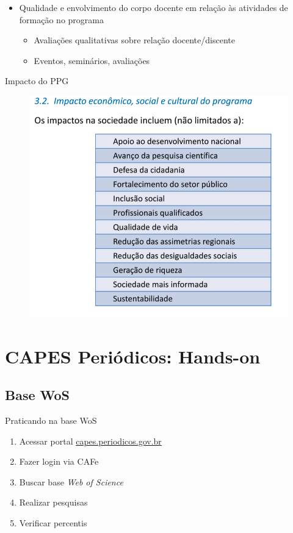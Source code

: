 \begin{frame}
\begin{itemize}
\item Qualidade e envolvimento do corpo docente em relação às atividades
de formação no programa
\begin{itemize}
\item Avaliações qualitativas sobre relação docente/discente
\item Eventos, seminários, avaliações
\end{itemize}
\end{itemize}
\end{frame}

\begin{frame}{Impacto do PPG}
\begin{figure}
\centering
\includegraphics[scale=0.35]{figs/03/impactos}
\end{figure}
\end{frame}


\section{CAPES Periódicos: Hands-on}

\subsection{Base WoS}

\begin{frame}{Praticando na base WoS}
\begin{enumerate}
\item Acessar portal \url{capes.periodicos.gov.br}
\item Fazer login via CAFe
\item Buscar base \textit{Web of Science}
\item Realizar pesquisas
\item Verificar percentis
\end{enumerate}
\end{frame}

